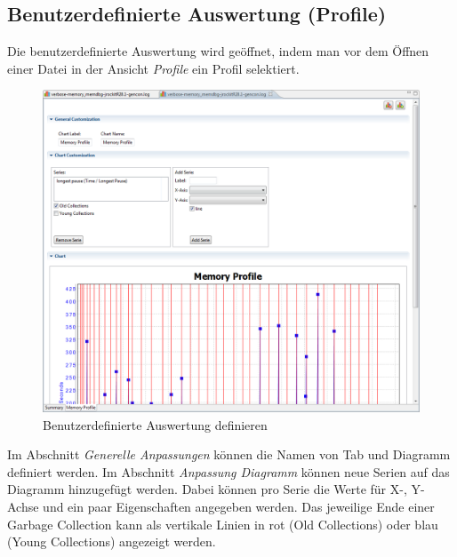 \subsection*{Benutzerdefinierte Auswertung (Profile)}
Die benutzerdefinierte Auswertung wird geöffnet, indem man vor dem Öffnen einer Datei in der Ansicht \textit{Profile} ein Profil selektiert. 
 \begin{figure}[H]
  	\centering
    	\includegraphics[width=15cm]{images/tutorial_custom_report}
        	\caption{Benutzerdefinierte Auswertung definieren}
\end{figure}
Im Abschnitt \textit{Generelle Anpassungen} können die Namen von Tab  und Diagramm definiert werden. Im Abschnitt \textit{Anpassung Diagramm} können neue Serien auf das Diagramm hinzugefügt werden. Dabei können pro Serie die Werte für X-, Y-Achse und ein paar Eigenschaften angegeben werden. Das jeweilige Ende einer Garbage Collection kann als vertikale Linien in rot (Old Collections) oder blau (Young Collections) angezeigt werden.

